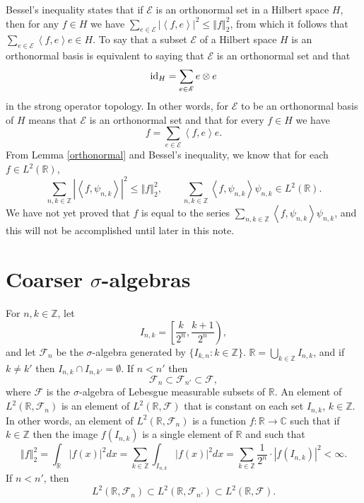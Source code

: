 \documentclass{article}
\newcommand{\inner}[2]{\left\langle #1, #2 \right\rangle}
\newcommand{\id}{\ensuremath\mathrm{id}}
\newcommand{\norm}[1]{\left\Vert #1 \right\Vert}
\theoremstyle{definition}
\begin{document}
Bessel's inequality states that if $\mathscr{E}$ is an orthonormal set in a Hilbert space $H$, then for any $f \in H$ we have
  $\sum_{e \in \mathscr{E}} |\inner{f}{e}|^2 \leq \norm{f}_2^2$, from which it follows that $\sum_{e \in \mathscr{E}} \inner{f}{e}e \in H$.
To say that a subset $\mathscr{E}$ of a Hilbert space $H$ is  an orthonormal basis is equivalent to saying that $\mathscr{E}$ is
an orthonormal set and that
\[
\id_H = \sum_{e \in \mathscr{E}} e \otimes e
\]
in the strong operator topology. In other words, for $\mathscr{E}$ to be an orthonormal basis of $H$ means that $\mathscr{E}$
is an orthonormal set and that for every
$f \in H$ we have
\[
f = \sum_{e \in \mathscr{E}} \inner{f}{e}e.
\]
From Lemma \ref{orthonormal}  and Bessel's inequality, we know that for each $f \in L^2(\mathbb{R})$,
\[
\sum_{n,k \in \mathbb{Z}} |\inner{f}{\psi_{n,k}}|^2 \leq \norm{f}_2^2, \qquad
\sum_{n,k \in \mathbb{Z}} \inner{f}{\psi_{n,k}} \psi_{n,k} \in L^2(\mathbb{R}).
\]
We have not yet  proved that $f$ is equal to the series $\sum_{n,k \in \mathbb{Z}} \inner{f}{\psi_{n,k}} \psi_{n,k}$, and this will not be accomplished until later
in this note.




\section{Coarser $\sigma$-algebras}
For $n,k \in \mathbb{Z}$, let
\[
I_{n,k} = \left[ \frac{k}{2^n}, \frac{k+1}{2^n} \right),
\]
and let $\mathscr{F}_n$ be the $\sigma$-algebra generated by $\{I_{k,n}: k \in \mathbb{Z}\}$. 
$\mathbb{R} = \bigcup_{k \in \mathbb{Z}} I_{n,k}$, and if $k \neq k'$ then $I_{n,k} \cap I_{n,k'} = \emptyset$.
 If $n < n'$ then
\[
\mathscr{F}_n \subset \mathscr{F}_{n'} \subset \mathscr{F},
\]
where $\mathscr{F}$ is the $\sigma$-algebra of Lebesgue measurable subsets of $\mathbb{R}$.
An element  of $L^2(\mathbb{R},\mathscr{F}_n)$ is an element of $L^2(\mathbb{R},\mathscr{F})$ that is constant on each set $I_{n,k}$, $k \in \mathbb{Z}$. In other words, an element
of $L^2(\mathbb{R},\mathscr{F}_n)$ is a function $f:\mathbb{R} \to \mathbb{C}$
such that if $k \in \mathbb{Z}$ then the image $f(I_{n,k})$ is a single element of $\mathbb{R}$ and such that
\[
\norm{f}_2^2=\int_{\mathbb{R}} |f(x)|^2 dx =\sum_{k \in \mathbb{Z}} \int_{I_{n,k}} |f(x)|^2 dx= \sum_{k \in \mathbb{Z}}  \frac{1}{2^n} \cdot |f(I_{n,k})|^2 < \infty.
\]
If $n<n'$, then
\[
L^2(\mathbb{R},\mathscr{F}_n) \subset L^2(\mathbb{R},\mathscr{F}_{n'}) \subset L^2(\mathbb{R},\mathscr{F}).
\]
\end{document}
